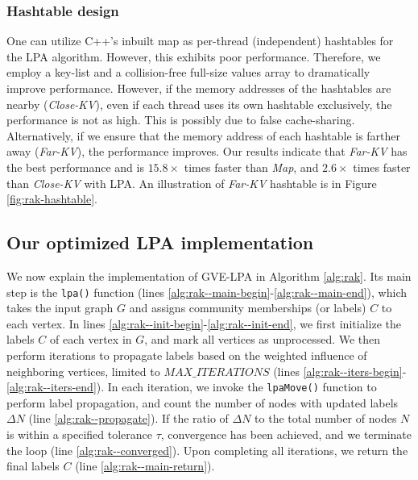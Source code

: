 \subsubsection{Hashtable design}

One can utilize C++'s inbuilt map as per-thread (independent) hashtables for the LPA algorithm. However, this exhibits poor performance. Therefore, we employ a key-list and a collision-free full-size values array to dramatically improve performance. However, if the memory addresses of the hashtables are nearby (\textit{Close-KV}), even if each thread uses its own hashtable exclusively, the performance is not as high. This is possibly due to false cache-sharing. Alternatively, if we ensure that the memory address of each hashtable is farther away (\textit{Far-KV}), the performance improves. Our results indicate that \textit{Far-KV} has the best performance and is $15.8\times$ times faster than \textit{Map}, and $2.6\times$ times faster than \textit{Close-KV} with LPA. An illustration of \textit{Far-KV} hashtable is in Figure \ref{fig:rak-hashtable}.







\subsection{Our optimized LPA implementation}

We now explain the implementation of GVE-LPA in Algorithm \ref{alg:rak}. Its main step is the \texttt{lpa()} function (lines \ref{alg:rak--main-begin}-\ref{alg:rak--main-end}), which takes the input graph $G$ and assigns community memberships (or labels) $C$ to each vertex. In lines \ref{alg:rak--init-begin}-\ref{alg:rak--init-end}, we first initialize the labels $C$ of each vertex in $G$, and mark all vertices as unprocessed. We then perform iterations to propagate labels based on the weighted influence of neighboring vertices, limited to $MAX\_ITERATIONS$ (lines \ref{alg:rak--iters-begin}-\ref{alg:rak--iters-end}). In each iteration, we invoke the \texttt{lpaMove()} function to perform label propagation, and count the number of nodes with updated labels $\Delta N$ (line \ref{alg:rak--propagate}). If the ratio of $\Delta N$ to the total number of nodes $N$ is within a specified tolerance $\tau$, convergence has been achieved, and we terminate the loop (line \ref{alg:rak--converged}). Upon completing all iterations, we return the final labels $C$ (line \ref{alg:rak--main-return}).

